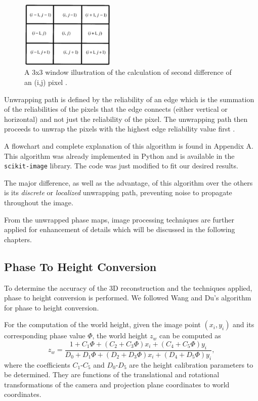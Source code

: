 \captionsetup[figure]{width=5in}
\begin{figure}[h!]
	\centering
	\includegraphics[width=0.4\textwidth]{figures/pixels.jpg}
	\caption[Calculation of second differences]{A 3x3 window illustration of the calculation of second difference of an (i,j) pixel \cite{Herraez2002}.}
	\label{fig:pixels}
\end{figure}

Unwrapping path is defined by the reliability of an edge which is  the summation of the reliabilities of the pixels that the edge connects (either vertical or horizontal) and not just the reliability of the pixel. The unwrapping path then proceeds to unwrap the pixels with the highest edge reliability value first \cite{Herraez2002}. 

A flowchart and complete explanation of this algorithm is found in Appendix A. This algorithm was already implemented in Python and is available in the \texttt{scikit-image} library. The code was just modified to fit our desired results.

The major difference, as well as the advantage, of this algorithm over the others is its \textit{discrete} or \textit{localized} unwrapping path, preventing noise to propagate throughout the image.

From the unwrapped phase maps, image processing techniques are further applied for enhancement of details which will be discussed in the following chapters.

\subsection{Phase To Height Conversion}

To determine the accuracy of the 3D reconstruction and the techniques applied, phase to height conversion is performed. We followed Wang and Du's algorithm \cite{Wang2009} for phase to height conversion.

For the computation of the world height, given the image point $(x_i,y_i)$ and its corresponding phase value $\Phi$, the world height $z_w$ can be computed as 
\begin{equation}
	z_w=\frac{1+C_1 \Phi + ( C_2 + C_3 \Phi)x_i+ ( C_4 + C_5 \Phi)y_i}{D_0+D_1 \Phi + ( D_2 + D_3 \Phi)x_i + ( D_4 + D_5 \Phi)y_i},
	\label{eq:zw}
\end{equation}
where the coefficients $C_1$-$C_5$ and $D_0$-$D_5$ are the height calibration parameters to be determined. They are functions of the translational and rotational transformations of the camera and projection plane coordinates to world coordinates.

